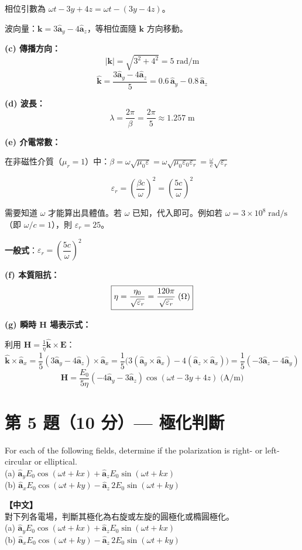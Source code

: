 \documentclass[12pt,a4paper]{article}
\newcommand{\vE}{\mathbf{E}}
\newcommand{\vH}{\mathbf{H}}
\newcommand{\vk}{\mathbf{k}}
\newcommand{\ax}{\hat{\mathbf{a}}_x}
\newcommand{\ay}{\hat{\mathbf{a}}_y}
\newcommand{\az}{\hat{\mathbf{a}}_z}
\begin{document}
\begin{solutionbox}[詳解]

相位引數為 $\omega t - 3y + 4z = \omega t - (3y - 4z)$。

波向量：$\vk = 3\ay - 4\az$，等相位面隨 $\vk$ 方向移動。

\textbf{(c) 傳播方向：}
\[
  |\vk| = \sqrt{3^2 + 4^2} = 5 \;\text{rad/m}
\]
\[
  \boxed{\hat{\vk} = \frac{3\ay - 4\az}{5} = 0.6\,\ay - 0.8\,\az}
\]

\textbf{(d) 波長：}
\[
  \boxed{\lambda = \frac{2\pi}{\beta} = \frac{2\pi}{5} \approx 1.257 \;\text{m}}
\]

\textbf{(e) 介電常數：}

在非磁性介質（$\mu_r = 1$）中：$\beta = \omega\sqrt{\mu_0\varepsilon} = \omega\sqrt{\mu_0\varepsilon_0\varepsilon_r} = \frac{\omega}{c}\sqrt{\varepsilon_r}$

\[
  \varepsilon_r = \left(\frac{\beta c}{\omega}\right)^2 = \left(\frac{5c}{\omega}\right)^2
\]

需要知道 $\omega$ 才能算出具體值。若 $\omega$ 已知，代入即可。例如若 $\omega = 3 \times 10^8\;\text{rad/s}$（即 $\omega/c = 1$），則 $\varepsilon_r = 25$。

\textbf{一般式}：$\boxed{\varepsilon_r = \left(\dfrac{5c}{\omega}\right)^2}$

\textbf{(f) 本質阻抗：}
\[
  \boxed{\eta = \frac{\eta_0}{\sqrt{\varepsilon_r}} = \frac{120\pi}{\sqrt{\varepsilon_r}} \;\text{(\ensuremath{\Omega})}}
\]

\textbf{(g) 瞬時 $\vH$ 場表示式：}

利用 $\vH = \frac{1}{\eta}\hat{\vk} \times \vE$：
\[
  \hat{\vk} \times \ax = \frac{1}{5}(3\ay - 4\az) \times \ax
  = \frac{1}{5}\bigl(3(\ay \times \ax) - 4(\az \times \ax)\bigr)
  = \frac{1}{5}(-3\az - 4\ay)
\]
\[
  \boxed{\vH = \frac{E_0}{5\eta}(-4\ay - 3\az)\cos(\omega t - 3y + 4z) \;\text{(A/m)}}
\]
\end{solutionbox}

\section{第 5 題（10 分）— 極化判斷}

\begin{questionbox}
For each of the following fields, determine if the polarization is right- or left-circular or elliptical.\\
(a) $\ay E_0\cos(\omega t + kx) + \az E_0\sin(\omega t + kx)$\\
(b) $\ax E_0\cos(\omega t + ky) - \az\,2E_0\sin(\omega t + ky)$

\medskip\noindent\textbf{【中文】}\\
對下列各電場，判斷其極化為右旋或左旋的圓極化或橢圓極化。\\
(a) $\ay E_0\cos(\omega t + kx) + \az E_0\sin(\omega t + kx)$\\
(b) $\ax E_0\cos(\omega t + ky) - \az\,2E_0\sin(\omega t + ky)$
\end{questionbox}
\end{document}
